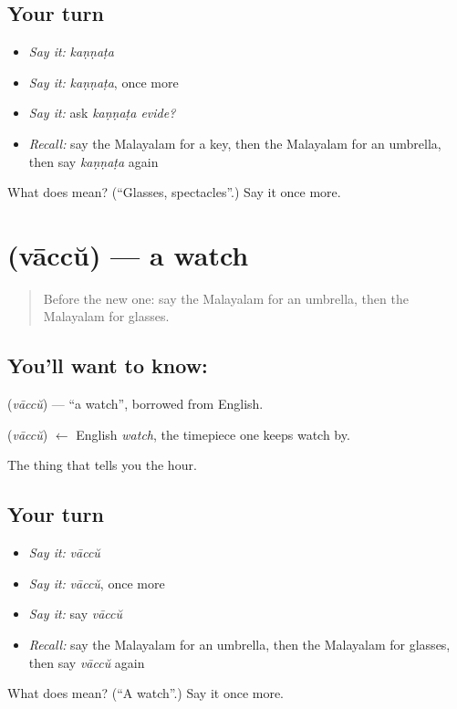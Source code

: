 \subsection*{Your turn}
\begin{itemize}
\raggedright
  \item \emph{Say it:} \emph{kaṇṇaṭa}
  \item \emph{Say it:} \emph{kaṇṇaṭa}, once more
  \item \emph{Say it:} ask \emph{kaṇṇaṭa evide?}
  \item \emph{Recall:} say the Malayalam for a key, then the Malayalam for an umbrella, then say \emph{kaṇṇaṭa} again
\end{itemize}

\begin{tcolorbox}[breakable,colback=teal!4,colframe=teal!35!black,title={Before you move on}]
What does  mean? (\textquotedblleft{}Glasses, spectacles\textquotedblright{}.) Say it once more.
\end{tcolorbox}
\section[\texorpdfstring{\ml{വാച്ച്} (vāccŭ)}{വാച്ച് (vāccŭ)}]{ (vāccŭ) — a watch}

\label{lesson:ML-C129-watch}



\begin{quote}
Before the new one: say the Malayalam for an umbrella, then the Malayalam for glasses.
\end{quote}

\subsection*{You'll want to know: }
\textbf{} (\emph{vāccŭ}) — \textquotedblleft{}a watch\textquotedblright{}, borrowed from English.

\begin{cousinweb}
\textbf{} (\emph{vāccŭ}) $\leftarrow$ English \emph{watch}, the timepiece one keeps watch by.
\end{cousinweb}

\begin{grammarlens}[title={What you've built}]
The thing that tells you the hour.
\end{grammarlens}

\subsection*{Your turn}
\begin{itemize}
\raggedright
  \item \emph{Say it:} \emph{vāccŭ}
  \item \emph{Say it:} \emph{vāccŭ}, once more
  \item \emph{Say it:} say \emph{vāccŭ}
  \item \emph{Recall:} say the Malayalam for an umbrella, then the Malayalam for glasses, then say \emph{vāccŭ} again
\end{itemize}

\begin{tcolorbox}[breakable,colback=teal!4,colframe=teal!35!black,title={Before you move on}]
What does  mean? (\textquotedblleft{}A watch\textquotedblright{}.) Say it once more.
\end{tcolorbox}
